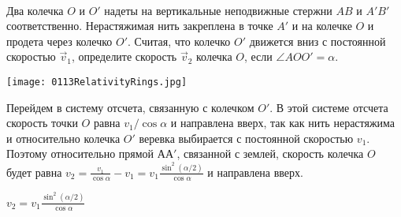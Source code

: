 \begin{ex}
\hspace{0pt} \\
\begin{minipage}{.65\textwidth}
Два колечка $O$ и $O'$ надеты на вертикальные неподвижные стержни $AB$ и $A'B'$ соответственно. 
Нерастяжимая нить закреплена в точке $A'$ и на колечке $O$ и продета через  колечко $O'$. 
Считая, что колечко $O'$ движется вниз с постоянной скоростью $\vec{v}_1$, определите скорость $\vec{v}_2$ колечка $O$, если  $\angle AOO' = \alpha$.
\end{minipage}
\begin{minipage}{.35\textwidth}
\centering
\texttt{[image: 0113RelativityRings.jpg]}
\end{minipage}
\begin{sol}
Перейдем в систему отсчета, связанную с колечком $O'$. В этой системе отсчета скорость точки $O$ равна $v_1/ \cos \alpha$ и направлена вверх, так как нить нерастяжима и относительно колечка $O'$ веревка выбирается с постоянной скоростью $v_1$. Поэтому относительно прямой $АА'$, связанной с землей, скорость колечка $O$ будет равна $v_2 = \frac{v_1}{\cos \alpha} - v_1 = v_1 \frac{\sin^2 (\alpha /2)}{\cos \alpha}$ и направлена вверх.
\end{sol}
\begin{ans}
$v_2 = v_1 \frac{\sin^2 (\alpha /2)}{\cos \alpha}$
\end{ans}
\end{ex}

